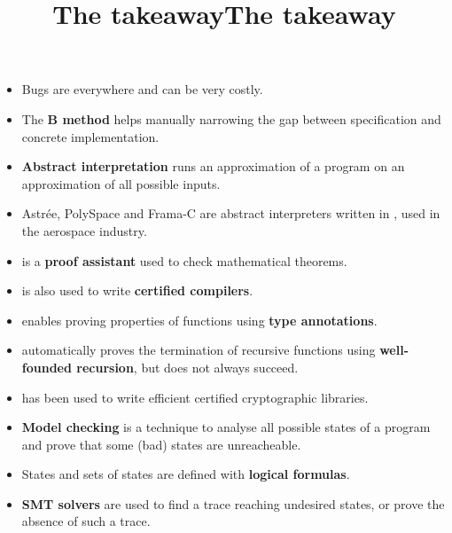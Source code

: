 \documentclass[wide]{slides}
\begin{document}
\begin{slide}
  \title{The takeaway}

  \begin{itemize}

    \item Bugs are everywhere and can be very costly.

    \item The \textbf{B method} helps manually narrowing the gap
      between specification and concrete implementation.

    \item \textbf{Abstract interpretation} runs an approximation of a
      program on an approximation of all possible inputs.

    \item Astrée, PolySpace and Frama-C are abstract interpreters
      written in \OCaml, used in the aerospace industry.

    \item \Coq is a \textbf{proof assistant} used to check
      mathematical theorems.

    \item \Coq is also used to write \textbf{certified compilers}.

  \end{itemize}

\end{slide}

\begin{slide}
  \title{The takeaway}

  \begin{itemize}

    \item \Fstar enables proving properties of functions using
      \textbf{type annotations}.

    \item \Fstar automatically proves the termination of recursive
      functions using \textbf{well-founded recursion}, but does not
      always succeed.

    \item \Fstar has been used to write efficient certified
      cryptographic libraries.

    \item \textbf{Model checking} is a technique to analyse all
      possible states of a program and prove that some (bad) states
      are unreacheable.

    \item States and sets of states are defined with \textbf{logical
      formulas}.

    \item \textbf{SMT solvers} are used to find a trace reaching
      undesired states, or prove the absence of such a trace.


  \end{itemize}

\end{slide}
\end{document}
